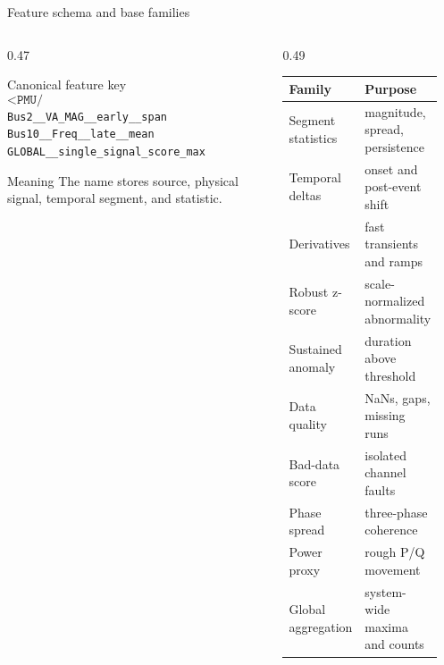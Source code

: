 ﻿\documentclass[10pt,aspectratio=169]{beamer}
\newcommand{\code}[1]{\texttt{\footnotesize #1}}
\begin{document}
\begin{frame}{Feature schema and base families}
\scriptsize
\begin{columns}[T,totalwidth=\textwidth]
\begin{column}{0.47\textwidth}
\begin{block}{Canonical feature key}
\[
\texttt{<PMU/BUS>\_\_<SIGNAL>\_\_<SEGMENT>\_\_<STAT>}
\]
\code{Bus2\_\_VA\_MAG\_\_early\_\_span}\\
\code{Bus10\_\_Freq\_\_late\_\_mean}\\
\code{GLOBAL\_\_single\_signal\_score\_max}
\end{block}
\begin{alertblock}{Meaning}
The name stores source, physical signal, temporal segment, and statistic.
\end{alertblock}
\end{column}
\begin{column}{0.49\textwidth}
\centering
\begin{tabular}{p{0.38\linewidth}p{0.50\linewidth}}
\toprule
\textbf{Family} & \textbf{Purpose}\\
\midrule
Segment statistics & magnitude, spread, persistence\\
Temporal deltas & onset and post-event shift\\
Derivatives & fast transients and ramps\\
Robust z-score & scale-normalized abnormality\\
Sustained anomaly & duration above threshold\\
Data quality & NaNs, gaps, missing runs\\
Bad-data score & isolated channel faults\\
Phase spread & three-phase coherence\\
Power proxy & rough P/Q movement\\
Global aggregation & system-wide maxima and counts\\
\bottomrule
\end{tabular}
\end{column}
\end{columns}
\end{frame}
\end{document}
